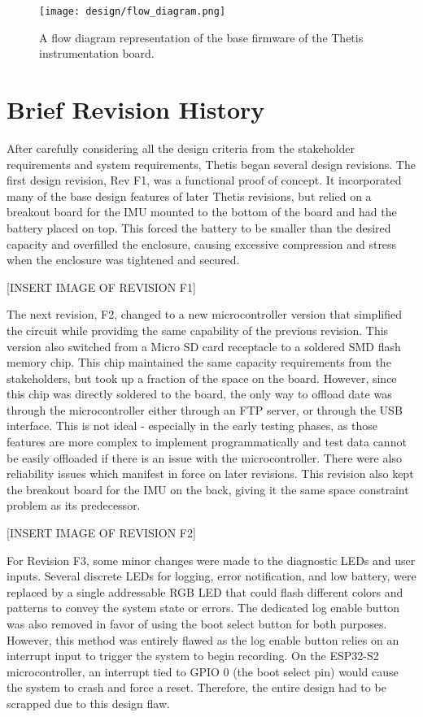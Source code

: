 \begin{figure}[h!]
	\caption[Base Firmware Flow Diagram]{A flow diagram representation of the base firmware of the Thetis instrumentation board.}
	\centering
	\texttt{[image: design/flow\_diagram.png]}
\end{figure}

\section{Brief Revision History} 
After carefully considering all the design criteria from the stakeholder requirements and system requirements, Thetis began several design revisions.
The first design revision, Rev F1, was a functional proof of concept.
It incorporated many of the base design features of later Thetis revisions, but relied on a breakout board for the IMU mounted to the bottom of the board and had the battery placed on top.
This forced the battery to be smaller than the desired capacity and overfilled the enclosure, causing excessive compression and stress when the enclosure was tightened and secured.

[INSERT IMAGE OF REVISION F1]

The next revision, F2, changed to a new microcontroller version that simplified the circuit while providing the same capability of the previous revision.
This version also switched from a Micro SD card receptacle to a soldered SMD flash memory chip.
This chip maintained the same capacity requirements from the stakeholders, but took up a fraction of the space on the board.
However, since this chip was directly soldered to the board, the only way to offload date was through the microcontroller either through an FTP server, or through the USB interface.
This is not ideal - especially in the early testing phases, as those features are more complex to implement programmatically and test data cannot be easily offloaded if there is an issue with the microcontroller.
There were also reliability issues which manifest in force on later revisions.
This revision also kept the breakout board for the IMU on the back, giving it the same space constraint problem as its predecessor.

[INSERT IMAGE OF REVISION F2]

For Revision F3, some minor changes were made to the diagnostic LEDs and user inputs.
Several discrete LEDs for logging, error notification, and low battery, were replaced by a single addressable RGB LED that could flash different colors and patterns to convey the system state or errors.
The dedicated log enable button was also removed in favor of using the boot select button for both purposes.
However, this method was entirely flawed as the log enable button relies on an interrupt input to trigger the system to begin recording.
On the ESP32-S2 microcontroller, an interrupt tied to GPIO 0 (the boot select pin) would cause the system to crash and force a reset.
Therefore, the entire design had to be scrapped due to this design flaw.

